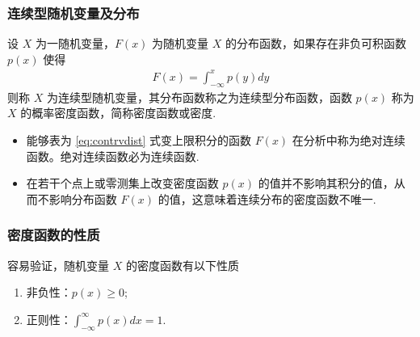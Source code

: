 \documentclass[Prob-All.tex]{subfiles}
\begin{document}



\begin{frame}
	\frametitle{连续型随机变量及分布}
	\begin{defi}[连续型随机变量] 设 $X$ 为一随机变量，$F (x)$ 为随机变量 $X$ 的分布函数，如果存在非负可积函数 $p (x)$ 使得
		\begin{eqnarray}\label{eq:contrvdist}
			F(x)=\int_{-\infty}^xp(y)dy
		\end{eqnarray}
		则称 $X$ 为连续型随机变量，其分布函数称之为连续型分布函数，函数 $p (x)$ 称为 $X$ 的概率密度函数，简称密度函数或密度.
	\end{defi}
	\pause
	\begin{rmk}
		\begin{itemize}[<+-|alert@+>]
			\item 能够表为 \eqref{eq:contrvdist} 式变上限积分的函数 $F (x)$ 在分析中称为绝对连续函数。绝对连续函数必为连续函数.
			\item 在若干个点上或零测集上改变密度函数 $p (x)$ 的值并不影响其积分的值，从而不影响分布函数 $F (x)$ 的值，这意味着连续分布的密度函数不唯一.
		\end{itemize}
	\end{rmk}

\end{frame}

\begin{frame}
	\frametitle{密度函数的性质}
	容易验证，随机变量 $X$ 的密度函数有以下性质
	\begin{enumerate}[<+-|alert@+>]
		\item 非负性：$p (x)\ge 0$;
		\item 正则性：$\int_{-\infty}^\infty p (x) dx=1$.
	\end{enumerate}

\end{frame}
\end{document}
